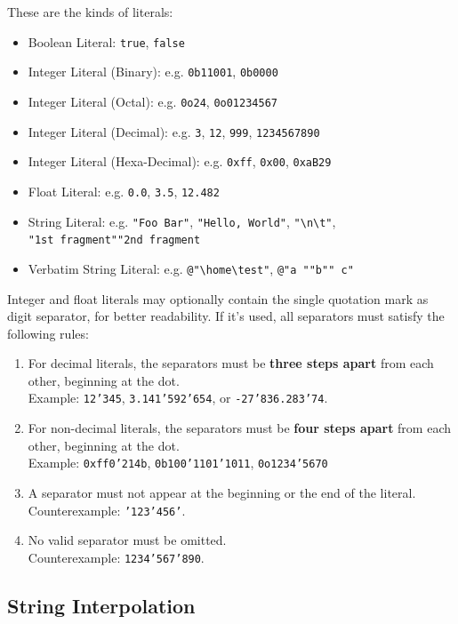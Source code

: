 \documentclass[a5paper]{report}
\begin{document}
These are the kinds of literals:
\begin{itemize}
	\item Boolean Literal: \texttt{true}, \texttt{false}
	\item Integer Literal (Binary): e.g. \texttt{0b11001}, \texttt{0b0000}
	\item Integer Literal (Octal): e.g. \texttt{0o24}, \texttt{0o01234567}
	\item Integer Literal (Decimal): e.g. \texttt{3}, \texttt{12}, \texttt{999}, \texttt{1234567890}
	\item Integer Literal (Hexa-Decimal): e.g. \texttt{0xff}, \texttt{0x00}, \texttt{0xaB29}
	\item Float Literal: e.g. \texttt{0.0}, \texttt{3.5}, \texttt{12.482}
	\item String Literal: e.g. \texttt{"Foo Bar"}, \texttt{"Hello, World"}, \texttt{"\textbackslash n\textbackslash t"},\\
		\texttt{"1st fragment"\textvisiblespace"2nd fragment}
	\item Verbatim String Literal: e.g. \texttt{@"\textbackslash home\textbackslash test"}, \texttt{@"a ""b"" c"}
\end{itemize}
Integer and float literals may optionally contain the single quotation mark as digit separator, for better readability.
If it's used, all separators must satisfy the following rules:
\begin{enumerate}
	\item For decimal literals, the separators must be \textbf{three steps apart} from each other, beginning at the dot. \\
		Example: \texttt{12'345}, \texttt{3.141'592'654}, or \texttt{-27'836.283'74}.
	\item For non-decimal literals, the separators must be \textbf{four steps apart} from each other, beginning at the dot. \\
		Example: \texttt{0xff0'214b}, \texttt{0b100'1101'1011}, \texttt{0o1234'5670}
	\item A separator must not appear at the beginning or the end of the literal. \\
		Counterexample: \texttt{'123'456'}.
	\item No valid separator must be omitted. \\
		Counterexample: \texttt{1234'567'890}.
\end{enumerate}

\subsection{String Interpolation}
\end{document}
